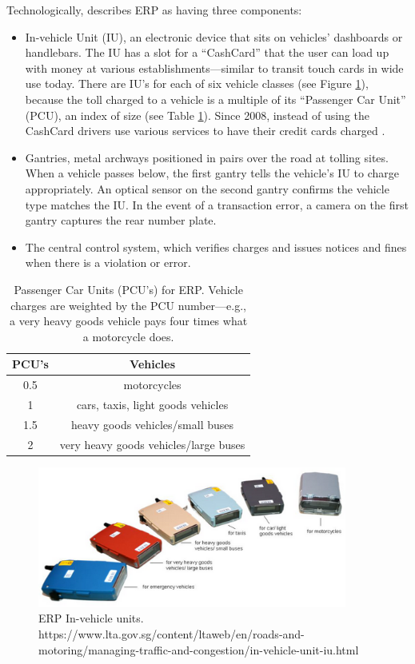 Technologically, \citet{Menon2004} describes ERP as having three components:

\begin{itemize}
\item In-vehicle Unit (IU), an electronic device that sits on vehicles' dashboards or handlebars. The IU has a slot for a ``CashCard'' that the user can load up with money at various establishments---similar to transit touch cards in wide use today. There are IU's for each of six vehicle classes (see Figure \ref{fig:singapore-IUs}), because the toll charged to a vehicle is a multiple of its ``Passenger Car Unit'' (PCU), an index of size (see Table \ref{tab:passenger-car-units}). Since 2008, instead of using the CashCard drivers use various services to have their credit cards charged \citep{Chew2009}.

\item Gantries, metal archways positioned in pairs over the road at tolling sites. When a vehicle passes below, the first gantry tells the vehicle's IU to charge appropriately. An optical sensor on the second gantry confirms the vehicle type matches the IU. In the event of a transaction error, a camera on the first gantry captures the rear number plate. 

\item The central control system, which verifies charges and issues notices and fines when there is a violation or error.
\end{itemize}

\begin{table}
	\begin{tabular}{|c|c|}
		\hline 
		PCU's & Vehicles\tabularnewline                              
		\hline 
		\hline 
		0.5   & motorcycles\tabularnewline                           
		\hline 
		1     & cars, taxis, light goods vehicles\tabularnewline     
		\hline 
		1.5   & heavy goods vehicles/small buses\tabularnewline      
		\hline 
		2     & very heavy goods vehicles/large buses\tabularnewline 
		\hline 
	\end{tabular}
	
	\caption{
	Passenger Car Units (PCU's) for ERP. Vehicle charges are weighted by the PCU number---e.g., a very heavy goods vehicle pays four times what a motorcycle does. \citep{LTA2016} 
	}
	\label{tab:passenger-car-units}
\end{table}

	
\begin{figure}
	\includegraphics[width=4in]{../img/singapore-IUs.jpg}
	\caption{ERP In-vehicle units. https://www.lta.gov.sg/content/ltaweb/en/roads-and-motoring/managing-traffic-and-congestion/in-vehicle-unit-iu.html}
	\label{fig:singapore-IUs}
\end{figure}

